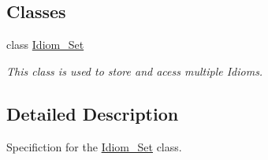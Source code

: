 \subsection*{Classes}
\begin{DoxyCompactItemize}
\item 
class \hyperlink{classIdiom__Set}{Idiom\+\_\+\+Set}
\begin{DoxyCompactList}\small\item\em This class is used to store and acess multiple Idioms. \end{DoxyCompactList}\end{DoxyCompactItemize}


\subsection{Detailed Description}
Specifiction for the \hyperlink{classIdiom__Set}{Idiom\+\_\+\+Set} class. 

